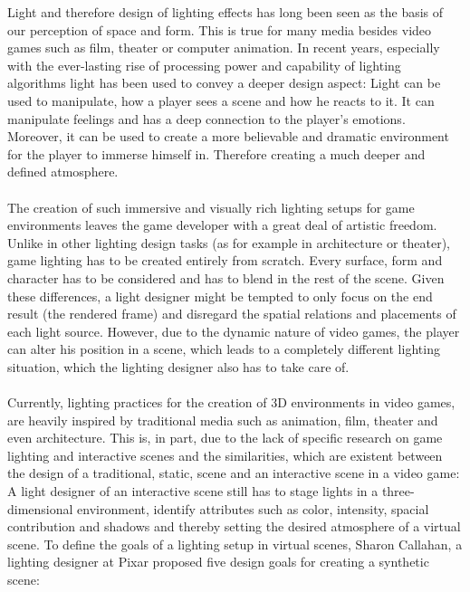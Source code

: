 Light and therefore design of lighting effects has long been seen as the basis of our perception of space and form. This is true for many media besides video games such as film, theater or computer animation. In recent years, especially with the ever-lasting rise of processing power and capability of lighting algorithms light has been used to convey a deeper design aspect: Light can be used to manipulate, how a player sees a scene and how he reacts to it. It can manipulate feelings and has a deep connection to the player's emotions. Moreover, it can be used to create a more believable and dramatic environment for the player to immerse himself in. Therefore creating a much deeper and defined atmosphere. \cite{Shadowplay}
\\\\
The creation of such immersive and visually rich lighting setups for game environments leaves the game developer with a great deal of artistic freedom. Unlike in other lighting design tasks (as for example in architecture or theater), game lighting has to be created entirely from scratch. Every surface, form and character has to be considered and has to blend in the rest of the scene. Given these differences, a light designer might be tempted to only focus on the end result (the rendered frame) and disregard the spatial relations and placements of each light source. However, due to the dynamic nature of video games, the player can alter his position in a scene, which leads to a completely different lighting situation, which the lighting designer also has to take care of. \cite{Niedenthal1404353}
\\\\
Currently, lighting practices for the creation of 3D environments in video games, are heavily inspired by traditional media such as animation, film, theater and even architecture. This is, in part, due to the lack of specific research on game lighting and interactive scenes \cite{Maggi.2006} and the similarities, which are existent between the design of a traditional, static, scene and an interactive scene in a video game: A light designer of an interactive scene still has to stage lights in a three-dimensional environment, identify attributes such as color, intensity, spacial contribution and shadows and thereby setting the desired atmosphere of a virtual scene.
\newline
To define the goals of a lighting setup in virtual scenes, Sharon Callahan, a lighting designer at Pixar proposed five design goals for creating a synthetic scene\cite{Storytelling}: 
